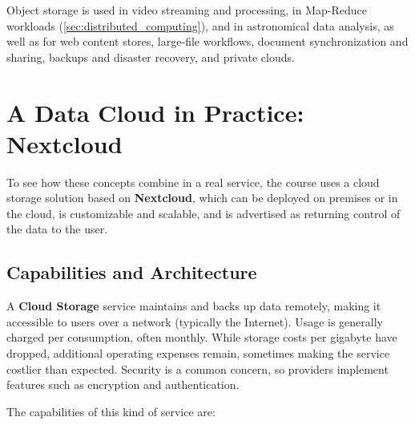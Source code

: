 Object storage is used in video streaming and processing, in Map-Reduce workloads (\cref{sec:distributed_computing}), and in astronomical data analysis, as well as for web content stores, large-file workflows, document synchronization and sharing, backups and disaster recovery, and private clouds.

\section{A Data Cloud in Practice: Nextcloud} \label{sec:nextcloud}

To see how these concepts combine in a real service, the course uses a cloud storage solution based on \textbf{Nextcloud}, which can be deployed on premises or in the cloud, is customizable and scalable, and is advertised as returning control of the data to the user.

\subsection{Capabilities and Architecture}

A \textbf{Cloud Storage} service maintains and backs up data remotely, making it accessible to users over a network (typically the Internet). Usage is generally charged per consumption, often monthly. While storage costs per gigabyte have dropped, additional operating expenses remain, sometimes making the service costlier than expected. Security is a common concern, so providers implement features such as encryption and authentication.

\smallskip

The capabilities of this kind of service are:
\smallskip

